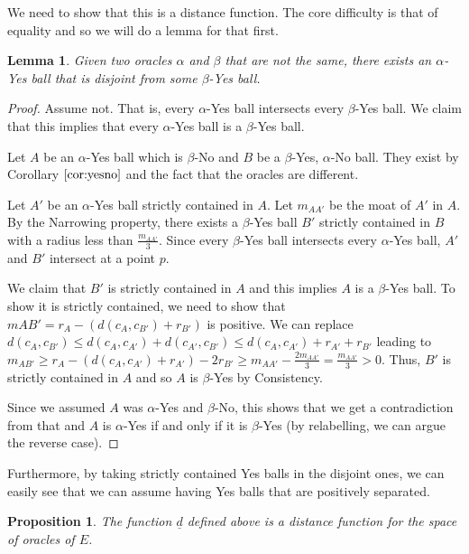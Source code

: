 \documentclass[12pt]{article}
\newtheorem{lemma}{Lemma}[section]
\newtheorem{proposition}{Proposition}[section]
\begin{document}
We need to show that this is a distance function. The core difficulty is that of equality and so we will do a lemma for that first. 


\begin{lemma}
    Given two oracles $\alpha$ and $\beta$ that are not the same, there exists an $\alpha$-Yes ball that is disjoint from some $\beta$-Yes ball.
\end{lemma}

\begin{proof}
Assume not. That is, every $\alpha$-Yes ball intersects every $\beta$-Yes ball. We claim that this implies that every $\alpha$-Yes ball is a $\beta$-Yes ball. 
    
     Let $A$ be an $\alpha$-Yes ball which is $\beta$-No and $B$ be a $\beta$-Yes, $\alpha$-No ball. They exist by Corollary $\ref{cor:yesno}$ and the fact that the oracles are different. 

    Let $A'$ be an $\alpha$-Yes ball strictly contained in $A$. Let $m_{AA'}$ be the moat of $A'$ in $A$. By the Narrowing property, there exists a $\beta$-Yes ball $B'$ strictly contained in $B$ with a radius less than $\frac{m_{AA'}}{3}$. Since every $\beta$-Yes ball intersects every $\alpha$-Yes ball, $A'$ and $B'$ intersect at a point $p$.

    We claim that $B'$ is strictly contained in $A$ and this implies $A$ is a $\beta$-Yes ball. To show it is strictly contained, we need to show that $m{AB'} = r_A - (d(c_A, c_{B'}) + r_{B'})$ is positive. We can replace $d(c_A, c_{B'}) \leq d(c_A, c_{A'}) + d(c_{A'}, c_{B'}) \leq d(c_A, c_{A'}) + r_{A'} + r_{B'}$ leading to $m_{AB'} \geq r_A - (d(c_A, c_{A'}) + r_{A'}) - 2 r_{B'} \geq m_{AA'} - \frac{2 m_{AA'}}{3} = \frac{m_{AA'}}{3}  > 0$. Thus, $B'$ is strictly contained in $A$ and so $A$ is $\beta$-Yes by Consistency. 
    
    Since we assumed $A$ was $\alpha$-Yes and $\beta$-No, this shows that we get a contradiction from that and $A$ is $\alpha$-Yes if and only if it is $\beta$-Yes (by relabelling, we can argue the reverse case). 
\end{proof}


Furthermore, by taking strictly contained Yes balls in the disjoint ones, we can easily see that we can assume having Yes balls  that are positively separated. 


\begin{proposition}
    The function $\underline{d}$ defined above is a distance function for the space of oracles of $E$. 
\end{proposition}
\end{document}
